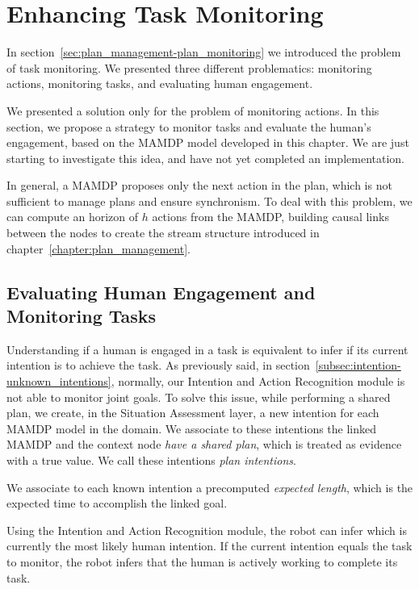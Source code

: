\section{Enhancing Task Monitoring}
\label{sec:mamdp-plan_monitoring}

In section~\ref{sec:plan_management-plan_monitoring} we introduced the problem of task monitoring. We presented three different problematics: monitoring actions, monitoring tasks, and evaluating human engagement.

We presented a solution only for the problem of monitoring actions. In this section, we propose a strategy to monitor tasks and evaluate the human's engagement, based on the MAMDP model developed in this chapter. We are just starting to investigate this idea, and have not yet completed an implementation.

In general, a MAMDP proposes only the next action in the plan, which is not sufficient to manage plans and ensure synchronism. To deal with this problem, we can compute an horizon of $h$ actions from the MAMDP, building causal links between the nodes to create the stream structure introduced in chapter~\ref{chapter:plan_management}.

\subsection{Evaluating Human Engagement and Monitoring Tasks}
Understanding if a human is engaged in a task is equivalent to infer if its current intention is to achieve the task. As previously said, in section~\ref{subsec:intention-unknown_intentions}, normally, our Intention and Action Recognition module is not able to monitor joint goals. To solve this issue, while performing a shared plan, we create, in the Situation Assessment layer, a new intention for each MAMDP model in the domain. We associate to these intentions the linked MAMDP and the context node \textit{have a shared plan}, which is treated as evidence with a true value. We call these intentions \textit{plan intentions}.

We associate to each known intention a precomputed \textit{expected length}, which is the expected time to accomplish the linked goal.

Using the Intention and Action Recognition module, the robot can infer which is currently the most likely human intention. If the current intention equals the task to monitor, the robot infers that the human is actively working to complete its task.

